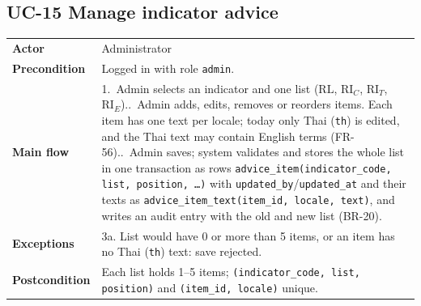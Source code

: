 \documentclass[11pt,a4paper]{article}
\newcommand{\RL}{\mathrm{RL}}
\newcommand{\RIC}{\mathrm{RI}_{C}}
\newcommand{\RIT}{\mathrm{RI}_{T}}
\newcommand{\RIE}{\mathrm{RI}_{E}}
\begin{document}
\noindent\begin{minipage}{\linewidth}
\subsection*{UC-15 Manage indicator advice}
\begin{tabularx}{\linewidth}{@{}>{\raggedright\leavevmode\bfseries\color{creBlue}}p{2.6cm} Y@{}}
\toprule
Actor & Administrator \\
Precondition & Logged in with role \texttt{admin}. \\
Main flow & 1.~Admin selects an indicator and one list ($\RL$, $\RIC$, $\RIT$, $\RIE$)..~Admin adds, edits, removes or reorders items. Each item has one text per locale; today only Thai (\texttt{th}) is edited, and the Thai text may contain English terms (FR-56)..~Admin saves; system validates and stores the whole list in one transaction as rows \texttt{advice\_item(indicator\_code, list, position, \dots)} with \texttt{updated\_by}/\texttt{updated\_at} and their texts as \texttt{advice\_item\_text(item\_id, locale, text)}, and writes an audit entry with the old and new list (BR-20). \\
Exceptions & 3a. List would have 0 or more than 5 items, or an item has no Thai (\texttt{th}) text: save rejected. \\
Postcondition & Each list holds 1--5 items; \texttt{(indicator\_code, list, position)} and \texttt{(item\_id, locale)} unique. \\
\bottomrule
\end{tabularx}
\end{minipage}
\par\medskip
\end{document}
